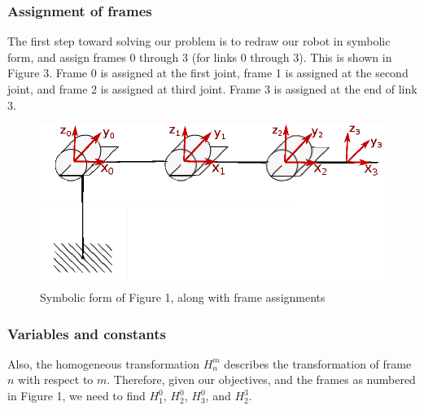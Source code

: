 \documentclass[conference]{IEEEtran}
\begin{document}
\subsubsection{Assignment of frames}
The first step toward solving our problem is to redraw our robot in symbolic
form, and assign frames 0 through 3 (for links 0 through 3). This is shown in
Figure 3. Frame 0 is assigned at the first joint, frame 1 is assigned at the
second joint, and frame 2 is assigned at third joint. Frame 3 is assigned at
the end of link 3.\\
\begin{figure}[h]
    \centering
    \includegraphics[scale=0.8]{prob3_2_redraw}
    \caption{Symbolic form of Figure 1, along with frame assignments}
    \setlength{\belowcaptionskip}{-50pt}
\end{figure}
\subsubsection{Variables and constants}
Also, the homogeneous transformation $H^m_n$ describes the transformation
of frame $n$ with respect to $m$.
Therefore, given our objectives, and the frames as numbered in Figure 1, 
we need to find $H^0_1$, $H^0_2$, $H^0_3$, and $H^3_2$.
\end{document}

